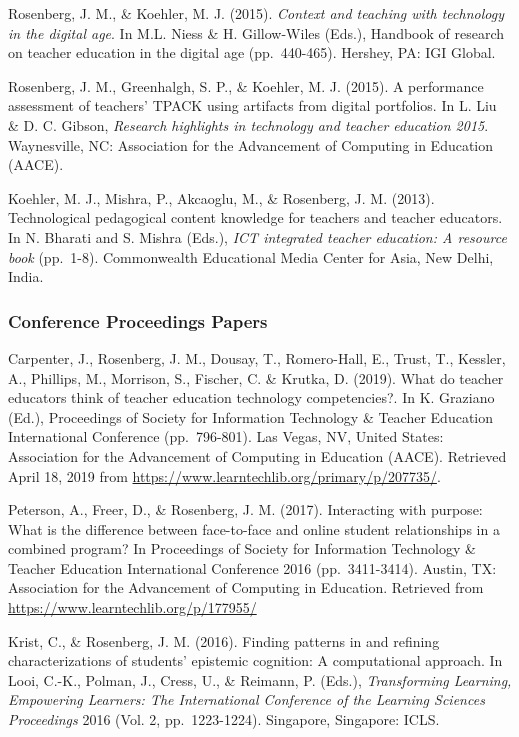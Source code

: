 \documentclass[14,]{article}
\begin{document}
Rosenberg, J. M., \& Koehler, M. J. (2015). \emph{Context and teaching
with technology in the digital age}. In M.L. Niess \& H. Gillow-Wiles
(Eds.), Handbook of research on teacher education in the digital age
(pp.~440-465). Hershey, PA: IGI Global.

Rosenberg, J. M., Greenhalgh, S. P., \& Koehler, M. J. (2015). A
performance assessment of teachers' TPACK using artifacts from digital
portfolios. In L. Liu \& D. C. Gibson, \emph{Research highlights in
technology and teacher education 2015}. Waynesville, NC: Association for
the Advancement of Computing in Education (AACE).

Koehler, M. J., Mishra, P., Akcaoglu, M., \& Rosenberg, J. M. (2013).
Technological pedagogical content knowledge for teachers and teacher
educators. In N. Bharati and S. Mishra (Eds.), \emph{ICT integrated
teacher education: A resource book} (pp.~1-8). Commonwealth Educational
Media Center for Asia, New Delhi, India.

\hypertarget{conference-proceedings-papers}{%
\subsubsection{Conference Proceedings
Papers}\label{conference-proceedings-papers}}

Carpenter, J., Rosenberg, J. M., Dousay, T., Romero-Hall, E., Trust, T.,
Kessler, A., Phillips, M., Morrison, S., Fischer, C. \& Krutka, D.
(2019). What do teacher educators think of teacher education technology
competencies?. In K. Graziano (Ed.), Proceedings of Society for
Information Technology \& Teacher Education International Conference
(pp.~796-801). Las Vegas, NV, United States: Association for the
Advancement of Computing in Education (AACE). Retrieved April 18, 2019
from \url{https://www.learntechlib.org/primary/p/207735/}.

Peterson, A., Freer, D., \& Rosenberg, J. M. (2017). Interacting with
purpose: What is the difference between face-to-face and online student
relationships in a combined program? In Proceedings of Society for
Information Technology \& Teacher Education International Conference
2016 (pp.~3411-3414). Austin, TX: Association for the Advancement of
Computing in Education. Retrieved from
\url{https://www.learntechlib.org/p/177955/}

Krist, C., \& Rosenberg, J. M. (2016). Finding patterns in and refining
characterizations of students' epistemic cognition: A computational
approach. In Looi, C.-K., Polman, J., Cress, U., \& Reimann, P. (Eds.),
\emph{Transforming Learning, Empowering Learners: The International
Conference of the Learning Sciences Proceedings} 2016 (Vol. 2,
pp.~1223-1224). Singapore, Singapore: ICLS.
\end{document}

